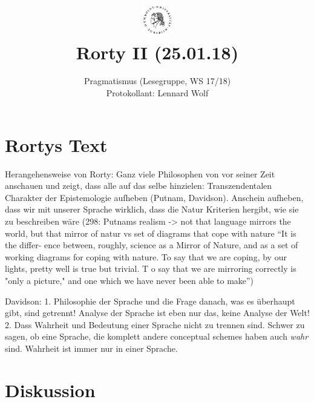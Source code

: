 \documentclass[a4paper, emulatestandardclasses]{scrartcl}
\date{\vspace{-3ex}}
\begin{document}
\title{
    \vspace{-30pt}
	\includegraphics*[width=0.1\textwidth,right]{ErstesSem/images/hu_logo2.png}\\
	\vspace{-10pt}
	Rorty II (25.01.18)}%
	\subtitle{Pragmatismus (Lesegruppe, WS 17/18)\\
          Protokollant: Lennard Wolf}
\maketitle
\vspace{-40pt}

\section*{Rortys Text}

Herangehensweise von Rorty: Ganz viele Philosophen von vor seiner Zeit anschauen und zeigt, dass alle auf das selbe hinzielen: Transzendentalen Charakter der Epistemologie aufheben (Putnam, Davidson). Anschein aufheben, dass wir mit unserer Sprache wirklich, dass die Natur Kriterien hergibt, wie sie zu beschreiben wäre (298: Putnams realism -> not that language mirrors the world, but that mirror of natur vs set of diagrams that cope with nature "`It is the differ- ence between, roughly, science as a Mirror of Nature, and as a set of working diagrams for coping with nature. To say that we are coping, by our lights, pretty well is true but trivial. T o say that we are mirroring correctly is "only a picture," and one which we have never been able to make"')

Davidson: 1. Philosophie der Sprache und die Frage danach, was es überhaupt gibt, sind getrennt! Analyse der Sprache ist eben nur das, keine Analyse der Welt! 2. Dass Wahrheit und Bedeutung einer Sprache nicht zu trennen sind. Schwer zu sagen, ob eine Sprache, die komplett andere conceptual schemes haben auch \emph{wahr} sind. Wahrheit ist immer nur in einer Sprache.

\section*{Diskussion}
\end{document}

